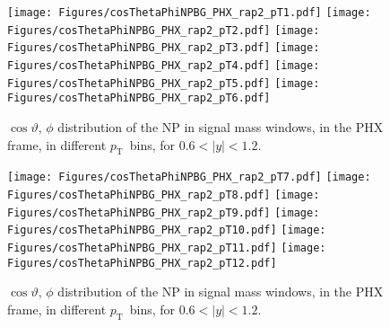 \documentclass[12pt]{article}
\newcommand{\pt}{$p_{\mathrm{T}}$}
\begin{document}
\begin{figure}[htbp]
\centering
\texttt{[image: Figures/cosThetaPhiNPBG\_PHX\_rap2\_pT1.pdf]}
\texttt{[image: Figures/cosThetaPhiNPBG\_PHX\_rap2\_pT2.pdf]}
\texttt{[image: Figures/cosThetaPhiNPBG\_PHX\_rap2\_pT3.pdf]}
\texttt{[image: Figures/cosThetaPhiNPBG\_PHX\_rap2\_pT4.pdf]}
\texttt{[image: Figures/cosThetaPhiNPBG\_PHX\_rap2\_pT5.pdf]}
\texttt{[image: Figures/cosThetaPhiNPBG\_PHX\_rap2\_pT6.pdf]}
\caption{$\cos\vartheta,\,\phi$ distribution of the NP in signal mass windows, 
	in the PHX frame, in different \pt\ bins, for $0.6 < |y| < 1.2$.}
\end{figure}
\clearpage

\begin{figure}[htbp]
\centering
\texttt{[image: Figures/cosThetaPhiNPBG\_PHX\_rap2\_pT7.pdf]}
\texttt{[image: Figures/cosThetaPhiNPBG\_PHX\_rap2\_pT8.pdf]}
\texttt{[image: Figures/cosThetaPhiNPBG\_PHX\_rap2\_pT9.pdf]}
\texttt{[image: Figures/cosThetaPhiNPBG\_PHX\_rap2\_pT10.pdf]}
\texttt{[image: Figures/cosThetaPhiNPBG\_PHX\_rap2\_pT11.pdf]}
\texttt{[image: Figures/cosThetaPhiNPBG\_PHX\_rap2\_pT12.pdf]}
\caption{$\cos\vartheta,\,\phi$ distribution of the NP in signal mass windows, 
	in the PHX frame, in different \pt\ bins, for $0.6 < |y| < 1.2$.}
\end{figure}
\clearpage
\end{document}
